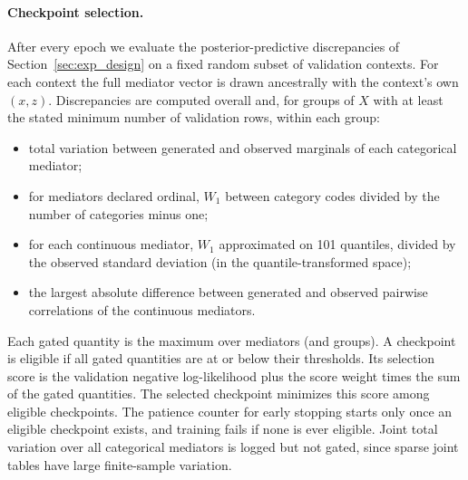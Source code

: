 \paragraph{Checkpoint selection.}
After every epoch we evaluate the posterior-predictive discrepancies of
Section~\ref{sec:exp_design} on a fixed random subset of validation contexts.
For each context the full mediator vector is drawn ancestrally with the
context's own $(x,z)$. Discrepancies are computed overall and, for groups of
$X$ with at least the stated minimum number of validation rows, within each
group:
\begin{itemize}[nosep]
  \item total variation between generated and observed marginals of each
        categorical mediator;
  \item for mediators declared ordinal, $W_1$ between category codes divided
        by the number of categories minus one;
  \item for each continuous mediator, $W_1$ approximated on 101 quantiles,
        divided by the observed standard deviation (in the quantile-transformed
        space);
  \item the largest absolute difference between generated and observed
        pairwise correlations of the continuous mediators.
\end{itemize}
Each gated quantity is the maximum over mediators (and groups). A checkpoint
is eligible if all gated quantities are at or below their thresholds. Its
selection score is the validation negative log-likelihood plus the
score weight times the sum of the gated quantities. The selected checkpoint
minimizes this score among eligible checkpoints. The patience counter for
early stopping starts only once an eligible checkpoint exists, and training
fails if none is ever eligible. Joint total variation over all categorical
mediators is logged but not gated, since sparse joint tables have large
finite-sample variation.

